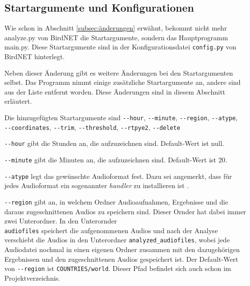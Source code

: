 
\subsection{Startargumente und Konfigurationen}
\label{subsec:configs}

Wie schon in Abschnitt \ref{subsec:änderungen} erwähnt, bekommt nicht mehr analyze.py von BirdNET die Startargumente, sondern das Hauptprogramm main.py. 
Diese Startargumente sind in der Konfigurationsdatei \texttt{config.py} von BirdNET hinterlegt.



Neben dieser Änderung gibt es weitere Änderungen bei den Startargumenten selbst. Das Programm nimmt einige zusätzliche Startargumente an, andere sind aus der Liste entfernt worden.
Diese Änderungen sind in diesem Abschnitt erläutert. 



Die hinzugefügten Startargumente sind \texttt{-{}-hour}, \texttt{-{}-minute}, \texttt{-{}-region}, \texttt{-{}-atype}, \\\texttt{-{}-coordinates}, \texttt{-{}-trim}, \texttt{-{}-threshold}, \texttt{-{}-rtpye2}, \texttt{-{}-delete}

\texttt{-{}-hour} gibt die Stunden an, die aufzuzeichnen sind. Default-Wert ist null.

\texttt{-{}-minute} gibt die Minuten an, die aufzuzeichnen sind. Default-Wert ist 20.

\texttt{-{}-atype} legt das gewünschte Audioformat fest. Dazu sei angemerkt, dass für jedes Audioformat ein sogenannter \textit{handler} zu installieren ist \cite{debian-libsox}. 

\texttt{-{}-region} gibt an, in welchem Ordner Audioaufnahmen, Ergebnisse und die daraus zugeschnittenen Audios zu speichern sind. Dieser Ornder hat dabei immer zwei Unterordner. In den Unterornder \\\texttt{audiofiles} speichert  die aufgenommenen Audios und  nach der Analyse verschiebt  die Audios in den Unterordner \texttt{analyzed\_audiofiles}, wobei jede Audiodatei nochmal in einen eigenen Ordner zusammen mit den dazugehörigen Ergebnissen und den zugeschnittenen Audios gespeichert ist.  Der Default-Wert von \texttt{-{}-region} ist \texttt{COUNTRIES/world}. Dieser Pfad befindet sich auch schon im Projektverzeichnis.

